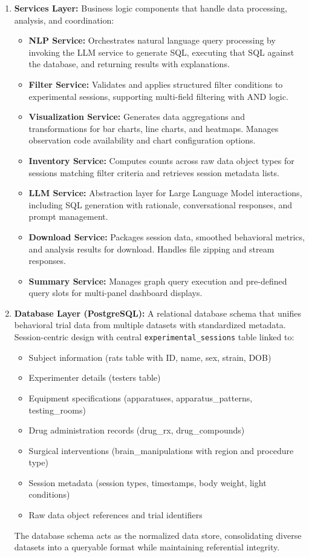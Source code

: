 \documentclass{article}
\begin{document}
\begin{enumerate}
    \item \textbf{Services Layer:} Business logic components that handle data processing, analysis, and coordination:
        \begin{itemize}
            \item \textbf{NLP Service:} Orchestrates natural language query processing by invoking the LLM service to generate SQL, executing that SQL against the database, and returning results with explanations.
            \item \textbf{Filter Service:} Validates and applies structured filter conditions to experimental sessions, supporting multi-field filtering with AND logic.
            \item \textbf{Visualization Service:} Generates data aggregations and transformations for bar charts, line charts, and heatmaps. Manages observation code availability and chart configuration options.
            \item \textbf{Inventory Service:} Computes counts across raw data object types for sessions matching filter criteria and retrieves session metadata lists.
            \item \textbf{LLM Service:} Abstraction layer for Large Language Model interactions, including SQL generation with rationale, conversational responses, and prompt management.
            \item \textbf{Download Service:} Packages session data, smoothed behavioral metrics, and analysis results for download. Handles file zipping and stream responses.
            \item \textbf{Summary Service:} Manages graph query execution and pre-defined query slots for multi-panel dashboard displays.
        \end{itemize}
    
    \item \textbf{Database Layer (PostgreSQL):} A relational database schema that unifies behavioral trial data from multiple datasets with standardized metadata. Session-centric design with central \texttt{experimental\_sessions} table linked to:
        \begin{itemize}
            \item Subject information (rats table with ID, name, sex, strain, DOB)
            \item Experimenter details (testers table)
            \item Equipment specifications (apparatuses, apparatus\_patterns, testing\_rooms)
            \item Drug administration records (drug\_rx, drug\_compounds)
            \item Surgical interventions (brain\_manipulations with region and procedure type)
            \item Session metadata (session types, timestamps, body weight, light conditions)
            \item Raw data object references and trial identifiers
        \end{itemize}
        The database schema acts as the normalized data store, consolidating diverse datasets into a queryable format while maintaining referential integrity.
    

\end{enumerate}
\end{document}
